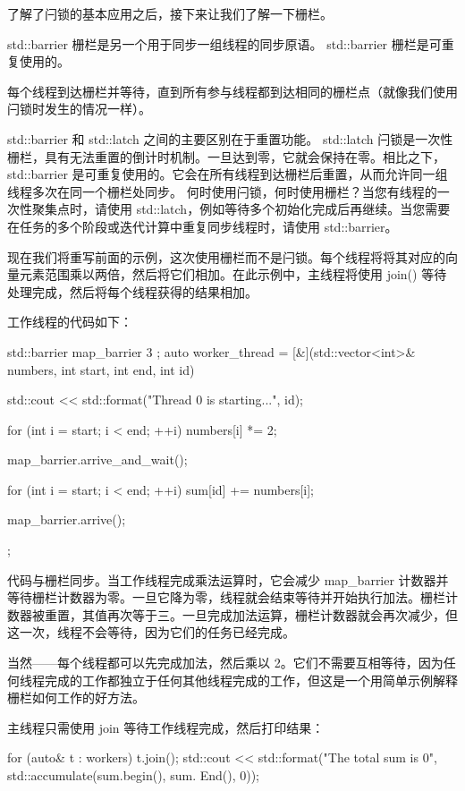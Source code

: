了解了闩锁的基本应用之后，接下来让我们了解一下栅栏。


std::barrier 栅栏是另一个用于同步一组线程的同步原语。 std::barrier 栅栏是可重复使用的。

每个线程到达栅栏并等待，直到所有参与线程都到达相同的栅栏点（就像我们使用闩锁时发生的情况一样）。

std::barrier 和 std::latch 之间的主要区别在于重置功能。 std::latch 闩锁是一次性栅栏，具有无法重置的倒计时机制。一旦达到零，它就会保持在零。相比之下， std::barrier 是可重复使用的。它会在所有线程到达栅栏后重置，从而允许同一组线程多次在同一个栅栏处同步。
何时使用闩锁，何时使用栅栏？当您有线程的一次性聚集点时，请使用 std::latch，例如等待多个初始化完成后再继续。当您需要在任务的多个阶段或迭代计算中重复同步线程时，请使用 std::barrier。

现在我们将重写前面的示例，这次使用栅栏而不是闩锁。每个线程将将其对应的向量元素范围乘以两倍，然后将它们相加。在此示例中，主线程将使用 join() 等待处理完成，然后将每个线程获得的结果相加。

工作线程的代码如下：

\begin{cpp}
std::barrier map_barrier{ 3 };
auto worker_thread = [&](std::vector<int>& numbers, int start, int
end, int id) {
    std::cout << std::format("Thread {0} is starting...\n", id);

    for (int i = start; i < end; ++i) {
        numbers[i] *= 2;
    }

    map_barrier.arrive_and_wait();

    for (int i = start; i < end; ++i) {
        sum[id] += numbers[i];
    }

    map_barrier.arrive();
};
\end{cpp}

代码与栅栏同步。当工作线程完成乘法运算时，它会减少 map\_barrier 计数器并等待栅栏计数器为零。一旦它降为零，线程就会结束等待并开始执行加法。栅栏计数器被重置，其值再次等于三。一旦完成加法运算，栅栏计数器就会再次减少，但这一次，线程不会等待，因为它们的任务已经完成。

当然——每个线程都可以先完成加法，然后乘以 2。它们不需要互相等待，因为任何线程完成的工作都独立于任何其他线程完成的工作，但这是一个用简单示例解释栅栏如何工作的好方法。

主线程只需使用 join 等待工作线程完成，然后打印结果：

\begin{cpp}
for (auto& t : workers) {
    t.join();
}
std::cout << std::format("The total sum is {0}\n",
                         std::accumulate(sum.begin(), sum. End(), 0));
\end{cpp}

